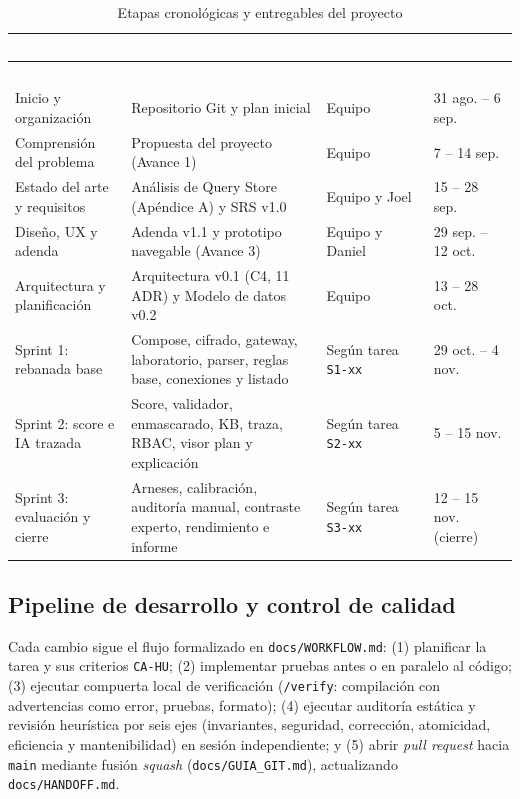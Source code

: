 \documentclass[12pt,a4paper]{article}
\begin{document}
\begingroup
{}
\scriptsize
\begin{longtable}{p{} p{} p{} p{}}
\toprule
\rowcolor{utbblue}
\textcolor{white}{\textbf{Etapa}} & \textcolor{white}{\textbf{Entregable principal}} & \textcolor{white}{\textbf{Responsable}} & \textcolor{white}{\textbf{Periodo}} \\
\midrule
\endfirsthead
\toprule
\rowcolor{utbblue}
\textcolor{white}{\textbf{Etapa}} & \textcolor{white}{\textbf{Entregable principal}} & \textcolor{white}{\textbf{Responsable}} & \textcolor{white}{\textbf{Periodo}} \\
\midrule
\endhead
\bottomrule
\caption{Etapas cronológicas y entregables del proyecto}
\label{tab:etapas}
\endlastfoot
Inicio y organización & Repositorio Git y plan inicial & Equipo & 31 ago. -- 6 sep. \\
Comprensión del problema & Propuesta del proyecto (Avance 1) & Equipo & 7 -- 14 sep. \\
Estado del arte y requisitos & Análisis de Query Store (Apéndice A) y SRS v1.0 & Equipo y Joel & 15 -- 28 sep. \\
Diseño, UX y adenda & Adenda v1.1 y prototipo navegable (Avance 3) & Equipo y Daniel & 29 sep. -- 12 oct. \\
Arquitectura y planificación & Arquitectura v0.1 (C4, 11 ADR) y Modelo de datos v0.2 & Equipo & 13 -- 28 oct. \\
Sprint 1: rebanada base & Compose, cifrado, gateway, laboratorio, parser, reglas base, conexiones y listado & Según tarea \texttt{S1-xx} & 29 oct. -- 4 nov. \\
Sprint 2: score e IA trazada & Score, validador, enmascarado, KB, traza, RBAC, visor plan y explicación & Según tarea \texttt{S2-xx} & 5 -- 15 nov. \\
Sprint 3: evaluación y cierre & Arneses, calibración, auditoría manual, contraste experto, rendimiento e informe & Según tarea \texttt{S3-xx} & 12 -- 15 nov. (cierre) \\
\end{longtable}
\endgroup

\subsection{Pipeline de desarrollo y control de calidad}

Cada cambio sigue el flujo formalizado en \texttt{docs/WORKFLOW.md}: (1) planificar la tarea y sus criterios \texttt{CA-HU}; (2) implementar pruebas antes o en paralelo al código; (3) ejecutar compuerta local de verificación (\texttt{/verify}: compilación con advertencias como error, pruebas, formato); (4) ejecutar auditoría estática y revisión heurística por seis ejes (invariantes, seguridad, corrección, atomicidad, eficiencia y mantenibilidad) en sesión independiente; y (5) abrir \textit{pull request} hacia \texttt{main} mediante fusión \textit{squash} (\texttt{docs/GUIA\_GIT.md}), actualizando \texttt{docs/HANDOFF.md}.
\end{document}
